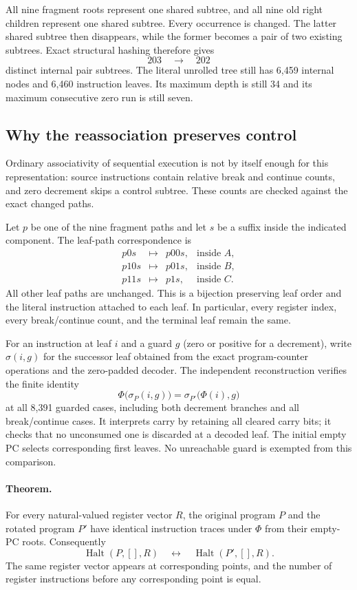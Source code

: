 All nine fragment roots represent one shared subtree, and all nine old
right children represent one shared subtree.  Every occurrence is changed.
The latter shared subtree then disappears, while the former becomes a
pair of two existing subtrees.  Exact structural hashing therefore gives
\[
 203\quad\longrightarrow\quad202
\]
distinct internal pair subtrees.  The literal unrolled tree still has
6,459 internal nodes and 6,460 instruction leaves.  Its maximum depth is
still 34 and its maximum consecutive zero run is still seven.

\subsection{Why the reassociation preserves control}

Ordinary associativity of sequential execution is not by itself enough
for this representation: source instructions contain relative break and
continue counts, and zero decrement skips a control subtree.  These counts
are checked against the exact changed paths.

Let $p$ be one of the nine fragment paths and let $s$ be a suffix inside
the indicated component.  The leaf-path correspondence is
\[
 \begin{array}{rcll}
 p0s  &\longmapsto&p00s,&\text{inside }A,\\
 p10s &\longmapsto&p01s,&\text{inside }B,\\
 p11s &\longmapsto&p1s,&\text{inside }C.
 \end{array}
\]
All other leaf paths are unchanged.  This is a bijection preserving leaf
order and the literal instruction attached to each leaf.  In particular,
every register index, every break/continue count, and the terminal leaf
remain the same.

For an instruction at leaf $i$ and a guard $g$ (zero or positive for a
decrement), write $\sigma(i,g)$ for the successor leaf obtained from the
exact program-counter operations and the zero-padded decoder.  The
independent reconstruction verifies the finite identity
\[
 \Phi\bigl(\sigma_P(i,g)\bigr)
 =\sigma_{P'}\bigl(\Phi(i),g\bigr)
\]
at all 8,391 guarded cases, including both decrement branches and all
break/continue cases.  It interprets carry by retaining all cleared carry
bits; it checks that no unconsumed one is discarded at a decoded leaf.
The initial empty PC selects corresponding first leaves.  No unreachable
guard is exempted from this comparison.

\paragraph{Theorem.}
For every natural-valued register vector $R$, the original program $P$
and the rotated program $P'$ have identical instruction traces under
$\Phi$ from their empty-PC roots.  Consequently
\[
 \operatorname{Halt}(P,[],R)
 \quad\longleftrightarrow\quad
 \operatorname{Halt}(P',[],R).
\]
The same register vector appears at corresponding points, and the number
of register instructions before any corresponding point is equal.

